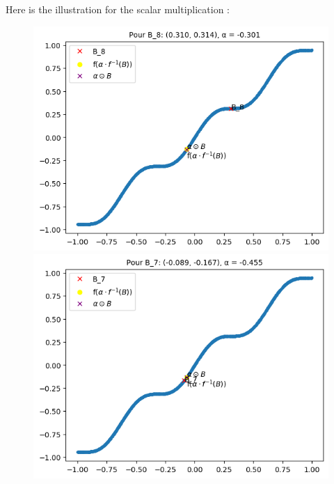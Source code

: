 \documentclass{article}
\begin{document}
            Here is the illustration for the scalar multiplication :
            \begin{figure}[h]
                \centering
                \begin{minipage}{0.5\textwidth}
                    \centering
                    \includegraphics[width=0.9\linewidth]{./images/alpha1.png}
                \end{minipage}%
                \begin{minipage}{0.5\textwidth}
                    \centering
                    \includegraphics[width=0.9\linewidth]{./images/alpha2.png}
                \end{minipage}
            \end{figure}
            
\end{document}
